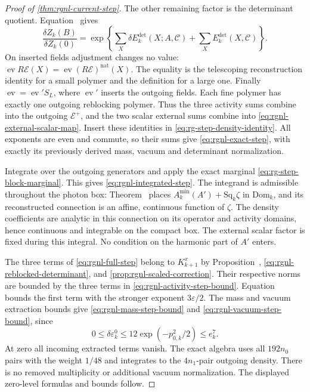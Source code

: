 \begin{proof}[Proof of \cref{thm:rgnl-current-step}]
The other remaining factor is the determinant quotient.
Equation~ gives
\[
 \frac{\delta Z_k(B)}{\delta Z_k(0)}
      =\exp\left\{\sum_X\delta E_k^{\mathrm{det}}(X;A,\mathscr C)
                               +\sum_XE_k^{\mathrm{det}}(X,\mathscr C)\right\}.
\]
On inserted fields adjustment changes no value:
$\operatorname{ev}R\mathscr E(X)
=\operatorname{ev}(R\mathscr E)^{\mathrm{nat}}(X)$.
The equality is the telescoping reconstruction identity
for a small polymer and the definition for a large one.
Finally $\operatorname{ev}=\operatorname{ev}'S_L$,
where $\operatorname{ev}'$ inserts the outgoing fields.
Each fine polymer has exactly one outgoing reblocking
polymer. Thus the three activity sums combine into the
outgoing $\mathscr E^+$, and the two scalar external sums
combine into \eqref{eq:rgnl-external-scalar-map}.
Insert these identities in
\eqref{eq:rg-step-density-identity}. All exponents are
even and commute, so their sums give
\eqref{eq:rgnl-exact-step}, with exactly its previously
derived mass, vacuum and determinant normalization.

Integrate over the outgoing generators and apply the exact
marginal \eqref{eq:rg-step-block-marginal}. This gives
\eqref{eq:rgnl-integrated-step}.
The integrand is admissible throughout the photon box:
Theorem~ places
$A_k^{\min}(A')+\mathrm{Sq}_k\zeta$ in
$\mathrm{Dom}_k$, and its reconstructed connection is
an affine, continuous function of $\zeta$.
The density coefficients are analytic in this connection
on its operator and activity domains, hence continuous
and integrable on the compact box.
The external scalar factor is fixed during this integral.
No condition on the harmonic part of $A'$ enters.

The three terms of \eqref{eq:rgnl-full-step} belong to
$K_{k+1}^x$ by Proposition~,
\eqref{eq:rgnl-reblocked-determinant}, and
\cref{prop:rgnl-scaled-correction}.
Their respective norms are bounded by the three terms
in \eqref{eq:rgnl-activity-step-bound}.
Equation~ bounds the
first term with the stronger exponent $3\varepsilon/2$.
The mass and vacuum extraction bounds give
\eqref{eq:rgnl-mass-step-bound} and
\eqref{eq:rgnl-vacuum-step-bound}, since
\[
 0\le\delta\varepsilon_k^0
        \le12\exp(-p_{0,k}^2/2)\le e_k^7.
\]
At zero all incoming extracted terms vanish.
The exact algebra uses all $192n_0$ pairs with the
weight $1/48$ and integrates to the $4n_1$-pair
outgoing density. There is no removed multiplicity
or additional vacuum normalization. The displayed
zero-level formulas and bounds follow.
\end{proof}

